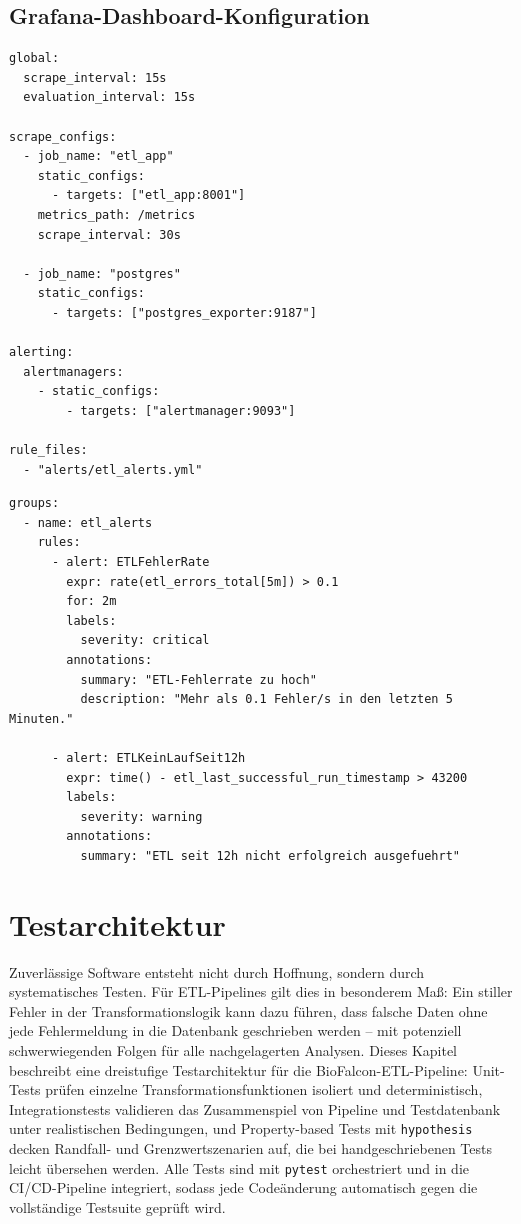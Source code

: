 ﻿\documentclass[12pt,a4paper]{report}
\theoremstyle{definition}
\theoremstyle{remark}
\newcommand{\code}[1]{\texttt{#1}}
\begin{document}
\section{Grafana-Dashboard-Konfiguration}

\begin{lstlisting}[style=yaml, caption={monitoring/prometheus.yml: Scrape-Konfiguration}]
global:
  scrape_interval: 15s
  evaluation_interval: 15s

scrape_configs:
  - job_name: "etl_app"
    static_configs:
      - targets: ["etl_app:8001"]
    metrics_path: /metrics
    scrape_interval: 30s

  - job_name: "postgres"
    static_configs:
      - targets: ["postgres_exporter:9187"]

alerting:
  alertmanagers:
    - static_configs:
        - targets: ["alertmanager:9093"]

rule_files:
  - "alerts/etl_alerts.yml"
\end{lstlisting}

\begin{lstlisting}[style=yaml, caption={alerts/etl\_alerts.yml: Alerting-Regeln}]
groups:
  - name: etl_alerts
    rules:
      - alert: ETLFehlerRate
        expr: rate(etl_errors_total[5m]) > 0.1
        for: 2m
        labels:
          severity: critical
        annotations:
          summary: "ETL-Fehlerrate zu hoch"
          description: "Mehr als 0.1 Fehler/s in den letzten 5 Minuten."

      - alert: ETLKeinLaufSeit12h
        expr: time() - etl_last_successful_run_timestamp > 43200
        labels:
          severity: warning
        annotations:
          summary: "ETL seit 12h nicht erfolgreich ausgefuehrt"
\end{lstlisting}

\chapter{Testarchitektur}
\label{sec:testing}

Zuverlässige Software entsteht nicht durch Hoffnung, sondern durch systematisches Testen. Für ETL-Pipelines gilt dies in besonderem Maß: Ein stiller Fehler in der Transformationslogik kann dazu führen, dass falsche Daten ohne jede Fehlermeldung in die Datenbank geschrieben werden -- mit potenziell schwerwiegenden Folgen für alle nachgelagerten Analysen. Dieses Kapitel beschreibt eine dreistufige Testarchitektur für die BioFalcon-ETL-Pipeline: Unit-Tests prüfen einzelne Transformationsfunktionen isoliert und deterministisch, Integrationstests validieren das Zusammenspiel von Pipeline und Testdatenbank unter realistischen Bedingungen, und Property-based Tests mit \code{hypothesis} decken Randfall- und Grenzwertszenarien auf, die bei handgeschriebenen Tests leicht übersehen werden. Alle Tests sind mit \code{pytest} orchestriert und in die CI/CD-Pipeline integriert, sodass jede Codeänderung automatisch gegen die vollständige Testsuite geprüft wird.
\end{document}
